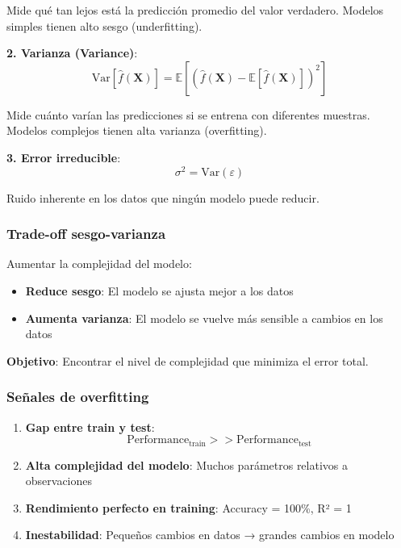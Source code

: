 \documentclass[
  doc,
  floatsintext,
  longtable,
  a4paper,
  nolmodern,
  notxfonts,
  notimes,
  12pt,
  colorlinks=true,linkcolor=blue,citecolor=blue,urlcolor=blue]{apa7}
\providecommand{\tightlist}{%
  \setlength{\itemsep}{0pt}\setlength{\parskip}{0pt}}
\begin{document}
Mide qué tan lejos está la predicción promedio del valor verdadero.
Modelos simples tienen alto sesgo (underfitting).

\textbf{2. Varianza (Variance)}: \[
\text{Var}[\hat{f}(\mathbf{X})] = \mathbb{E}[(\hat{f}(\mathbf{X}) - \mathbb{E}[\hat{f}(\mathbf{X})])^2]
\]

Mide cuánto varían las predicciones si se entrena con diferentes
muestras. Modelos complejos tienen alta varianza (overfitting).

\textbf{3. Error irreducible}: \[
\sigma^2 = \text{Var}(\varepsilon)
\]

Ruido inherente en los datos que ningún modelo puede reducir.

\subsubsection{Trade-off sesgo-varianza}\label{trade-off-sesgo-varianza}

Aumentar la complejidad del modelo:

\begin{itemize}
\tightlist
\item
  \textbf{Reduce sesgo}: El modelo se ajusta mejor a los datos
\item
  \textbf{Aumenta varianza}: El modelo se vuelve más sensible a cambios
  en los datos
\end{itemize}

\textbf{Objetivo}: Encontrar el nivel de complejidad que minimiza el
error total.

\subsubsection{Señales de overfitting}\label{seuxf1ales-de-overfitting}

\begin{enumerate}
\def\labelenumi{\arabic{enumi}.}
\item
  \textbf{Gap entre train y test}: \[
  \text{Performance}_{\text{train}} >> \text{Performance}_{\text{test}}
  \]
\item
  \textbf{Alta complejidad del modelo}: Muchos parámetros relativos a
  observaciones
\item
  \textbf{Rendimiento perfecto en training}: Accuracy = 100\%, R² = 1
\item
  \textbf{Inestabilidad}: Pequeños cambios en datos → grandes cambios en
  modelo
\end{enumerate}
\end{document}
